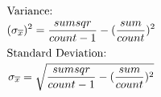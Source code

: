 \documentclass[
    a4paper,
    12pt
]{extreport}
\begin{document}
\begin{spreadlines}{20pt}
    \begin{gather}
        \intertext{Variance:}
        (\sigma_{\overline{x}})^{2} = \frac{sumsqr}{count-1} - (\frac{sum}{count})^{2}\\
        \intertext{Standard Deviation:}
        \sigma_{\overline{x}} = \sqrt{\frac{sumsqr}{count-1} - (\frac{sum}{count})^{2}}
    \end{gather}
\end{spreadlines}

\end{document}
